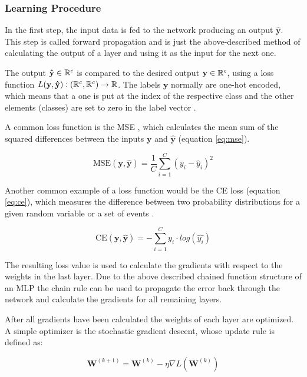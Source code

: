 \subsubsection{Learning Procedure}

In the first step, the input data is fed to the network producing an output $\mathbf{\hat{y}}$.
This step is called forward propagation and is just the above-described method of calculating the output of a layer and using it as the input for the next one.

The output $\mathbf{\hat{y}} \in \mathbb{R}^c$ is compared to the desired output $\mathbf{y} \in \mathbb{R}^c$, using a loss function $L(\mathbf{y}, \mathbf{\hat{y}}): (\mathbb{R}^c, \mathbb{R}^c) \to \mathbb{R}$.
The labels $\mathbf{y}$ normally are one-hot encoded, which means that a one is put at the index of the respective class and the other elements (classes) are set to zero in the label vector \cite{one_hot_enc}.

A common loss function is the \ac{MSE} \cite{yolov1}, which calculates the mean sum of the squared differences between the inputs $\mathbf{y}$ and $\mathbf{\hat{y}}$ (equation \ref{eq:mse}).

\begin{equation}
    \label{eq:mse}
    \text{MSE}(\mathbf{y}, \mathbf{\hat{y}}) = \frac{1}{C} \sum_{i=1}^{C}(y_i - \hat{y}_i)^2
\end{equation}

Another common example of a loss function would be the \ac{CE} loss (equation \ref{eq:ce}), which measures the difference between two probability distributions for a given random variable or a set of events \cite{loss_function_segmentation}.

\begin{equation}
    \label{eq:ce}
    \text{CE}(\mathbf{y}, \mathbf{\hat{y}}) = - \sum_{i=1}^C y_i \cdot log(\hat{y_i})
\end{equation}

The resulting loss value is used to calculate the gradients with respect to the weights in the last layer. Due to the above described chained function structure of an \ac{MLP} the chain rule can be used to propagate the error back through the network and calculate the gradients for all remaining layers.

After all gradients have been calculated the weights of each layer are optimized.
A simple optimizer is the stochastic gradient descent, whose update rule is defined as:

\begin{equation}
    \mathbf{W}^{(k+1)} = \mathbf{W}^{(k)} - \eta \nabla L(\mathbf{W}^{(k)})
\end{equation}

